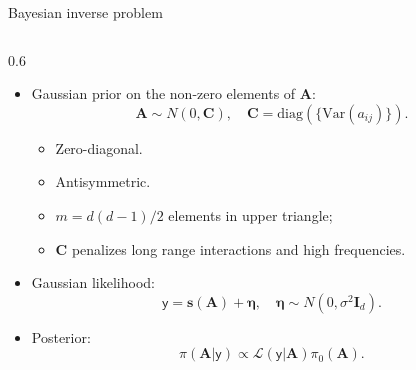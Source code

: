 \documentclass[aspectratio=169, 10pt, compress]{beamer}
\begin{document}
\begin{frame}{Bayesian inverse problem}
    \begin{columns}
    \begin{column}{0.6\textwidth}
    \begin{itemize}[<+->]
        \item Gaussian prior on the non-zero elements of $\bm{A}$:
        \[
        \bm{A} \sim N(0, \bm{C}), \quad \bm{C} = \mbox{diag}(\{\mbox{Var}(a_{ij})\}). %
        \]
        \begin{itemize}[<+->]
        \item Zero-diagonal.
        \item Antisymmetric.
        \item $m=d(d-1)/2$ elements in upper triangle;
        \item $\bm{C}$ penalizes long range interactions and high frequencies.
        \end{itemize}
        \item Gaussian likelihood:
        \begin{equation*}
            \mathbf{\mathsf{y}} = \bm{s}(\bm{A}) + \bm{\eta}, \quad \bm{\eta} \sim N(0, \sigma^2 \bm{I}_d). %
        \end{equation*}
        \item Posterior:
        \[
        \pi(\bm{A}|\mathbf{\mathsf{y}}) \propto \mathcal{L}(\mathbf{\mathsf{y}}|\bm{A}) \pi_0(\bm{A}).
        \]
    \end{itemize}

\end{column}
\end{columns}
\end{frame}
\end{document}
